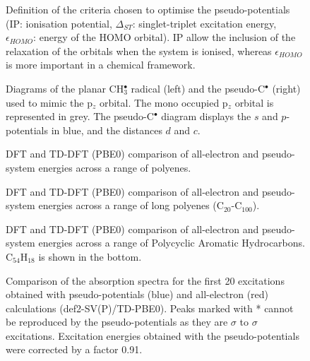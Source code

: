 \documentclass[12pt]{article}
\begin{document}

\clearpage

\begin{figure}
\caption{Definition of the criteria chosen to optimise the pseudo-potentials
(IP: ionisation potential, $\Delta_{ST}$: singlet-triplet excitation energy, $\epsilon_{HOMO}$: energy of the HOMO orbital).
IP allow the inclusion of the relaxation of the orbitals when the system is ionised, whereas $\epsilon_{HOMO}$ is more important
in a chemical framework.}
\label{figure:diagram}
\end{figure}

\begin{figure}
\caption{Diagrams of the planar CH\(^{\bullet}_{3}\) radical (left) and the pseudo-C\(^{\bullet}\) (right)
used to mimic the p$_z$ orbital.
The mono occupied p$_z$ orbital is represented in grey.
The pseudo-C\(^{\bullet}\) diagram displays the \(s\) and \(p\)-potentials in blue,
and the distances \(d\) and \(c\).}
\label{figure:ref_pseudo_diagram}
\end{figure}

\begin{figure}
\caption{DFT and TD-DFT (PBE0) comparison of all-electron and pseudo-system energies across a range of
polyenes.}
\label{fig:alkenes_hf_dft}
\end{figure}

\begin{figure}
\caption{DFT and TD-DFT (PBE0) comparison of all-electron and pseudo-system energies across a range of long polyenes (C\(_{20}\)-C\(_{100}\)).}
\label{fig:long_chain_graphs}
\end{figure}

\begin{figure}
\caption{DFT and TD-DFT (PBE0) comparison of all-electron and pseudo-system energies across a range of Polycyclic Aromatic Hydrocarbons. 
C\(_{54}\)H\(_{18}\) is shown in the bottom.}
\label{fig:rings_graphs}
\end{figure}

\begin{figure}
\caption{Comparison of the absorption spectra for the first 20 excitations obtained with
pseudo-potentials (blue) and all-electron (red) calculations (def2-SV(P)/TD-PBE0). Peaks marked
with * cannot be reproduced by the pseudo-potentials as they are $\sigma$ to $\sigma$ excitations.
Excitation energies obtained with the pseudo-potentials were corrected by a factor 0.91.}
\label{fig:cnhn_uv}
\end{figure}
\end{document}
